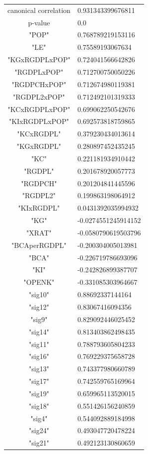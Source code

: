 \documentclass[11pt,a4paper,oneside]{report}
\begin{document}
\begin{tabular}{ c | l }
canonical correlation &  0.931343399676811\\
p-value & 0.0\\
\hline
"POP" & 0.768789219153116\\
"LE" & 0.75589193067634\\
"KGxRGDPLxPOP" & 0.724041566642826\\
"RGDPLxPOP" & 0.712700750050226\\
"RGDPCHxPOP" & 0.712674980119381\\
"RGDPL2xPOP" & 0.712492101319333\\
"KCxRGDPLxPOP" & 0.699062250542676\\
"KIxRGDPLxPOP" & 0.692573818759865\\
"KCxRGDPL" & 0.379230434013614\\
"KGxRGDPL" & 0.280897452435245\\
"KC" & 0.221181934910442\\
"RGDPL" & 0.201678920057773\\
"RGDPCH" & 0.201204841445596\\
"RGDPL2" & 0.199863198064912\\
"KIxRGDPL" & 0.0431392035994932\\
"KG" & -0.0274551245914152\\
"XRAT" & -0.0580790619503796\\
"BCAperRGDPL" & -0.200304005013981\\
"BCA" & -0.226719786693096\\
"KI" & -0.242826899387707\\
"OPENK" & -0.331085303964667\\
\hline
"sig10" & 0.88692337144164\\
"sig12" & 0.83067416094356\\
"sig9" & 0.829092446025452\\
"sig14" & 0.813403862498435\\
"sig11" & 0.788793605804233\\
"sig16" & 0.769229375658728\\
"sig13" & 0.743377980660789\\
"sig17" & 0.742559765169964\\
"sig19" & 0.659965113520015\\
"sig18" & 0.551426156240859\\
"sig4" & 0.544092889184998\\
"sig24" & 0.493047720478224\\
"sig21" & 0.492123130860659\\

\end{tabular}
\end{document}

